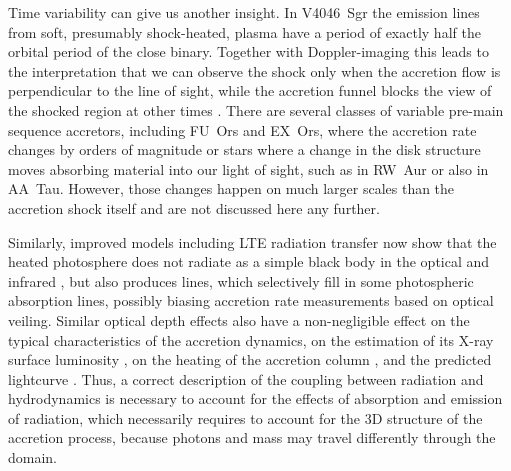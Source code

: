 Time variability can give us another insight. In V4046~Sgr the emission lines from soft, presumably shock-heated, plasma have a period of exactly half the orbital period of the close binary. Together with Doppler-imaging this leads to the interpretation that we can observe the shock only when the accretion flow is perpendicular to the line of sight, while the accretion funnel blocks the view of the shocked region at other times \cite{2012ApJ...752..100A}. 
There are several classes of variable pre-main sequence accretors, including FU~Ors and EX~Ors, where the accretion rate changes by orders of magnitude or stars where a change in the disk structure moves absorbing material into our light of sight, such as in RW~Aur or also in AA~Tau. However, those changes happen on much larger scales than the accretion shock itself and are not discussed here any further.

Similarly, improved models including LTE radiation transfer now show that the heated photosphere does not radiate as a simple black body in the optical and infrared \cite{Dodin_2012,Dodin_2013}, but also produces lines, which selectively fill in some photospheric absorption lines, possibly biasing accretion rate measurements based on optical veiling.
Similar optical depth effects also
have a non-negligible effect on the typical characteristics of the 
accretion dynamics, on the estimation of its X-ray surface luminosity 
\cite{Sa_2019}, on the heating of the accretion column \cite{1999AstL...25..430L,Costa_2017}, and the predicted lightcurve \cite{2021ApJ...908...16R}.
Thus, a correct description of the coupling between 
radiation and hydrodynamics is necessary to account for the effects of absorption and emission of radiation, which necessarily requires to account for the 3D structure of the accretion process, because photons and mass may travel differently through the domain.



